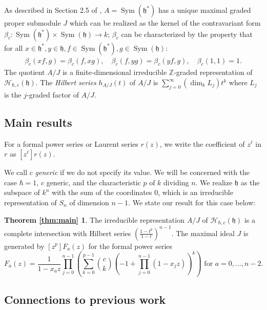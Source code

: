 \documentclass{amsart}
\numberwithin{equation}{section}
\theoremstyle{definition}
\newcommand{\h}{\mathfrak{h}}
\newcommand{\HH}{\mathcal{H}}
\newcommand{\Sym}{\operatorname{Sym}}
\begin{document}
As described in Section 2.5 of \cite{BC1}, $A=\Sym(\h^*)$ has a unique maximal graded proper submodule $J$ which can be realized as the kernel of the contravariant form $\beta_c: \Sym(\h^*) \times \Sym(\h) \to k$; $\beta_c$ can be characterized by the property that for all $x \in \h^*, y \in \h, f \in \Sym(\h^*), g \in  \Sym(\h)$:
\begin{align*}
\beta_c(xf,g)=\beta_c(f,xg), \quad \beta_c(f,yg) = \beta_c(yf,g), \quad \beta_c(1,1) = 1.
\end{align*}
The quotient $A/J$ is a finite-dimensional irreducible $\mathbb{Z}$-graded representation of $\HH_{\hbar,c}(\h)$. The {\it Hilbert series} $h_{A/J}(t)$ of $A/J$ is $\sum_{j=0}^\infty (\dim_k L_j)t^k$ where $L_j$ is the $j$-graded factor of $A/J$. 

\subsection{Main results}

For a formal power series or Laurent series $r(z)$, we write the coefficient of $z^\ell$ in $r$ as $[z^\ell]r(z)$. 

 We call $c$ {\it generic} if we do not specify its value. We will be concerned with the case $\hbar=1$, $c$ generic, and the characteristic $p$ of $k$ dividing $n$. We realize $\h$ as the subspace of $k^n$ with the sum of the coordinates $0$, which is an irreducible representation of $S_n$ of dimension $n-1$. We state our result for this case below:
 
 \newtheorem*{thm:main}{Theorem \ref{thm:main}}
\begin{thm:main} The irreducible representation $A/J$  of $\HH_{\hbar,c}(\h)$ is a complete intersection with  Hilbert series $\left(\frac{1-t^p}{1-t}\right)^{n-1}$. The maximal ideal $J$ is generated by $[z^p]F_a(z)$ for the formal power series
\[
F_a(z)=\frac{1}{1-x_az} \prod_{j=0}^{n-1}\left( \sum_{k=0}^{p-1} \binom{c}{k}(-1+\prod_{j=0}^{n-1} (1-x_jz))^k\right) \text{ for $a=0,\dots,n-2$}.
\]
\end{thm:main}


\subsection{Connections to previous work}
\end{document}

